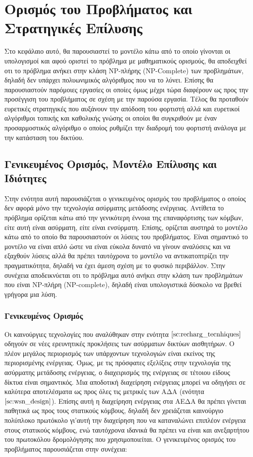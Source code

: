 

\chapter{Ορισμός του Προβλήματος και Στρατηγικές Επίλυσης} \label{ch:strategies_solution}
Στο κεφάλαιο αυτό, θα παρουσιαστεί το μοντέλο κάτω από το οποίο γίνονται οι υπολογισμοί και αφού οριστεί το πρόβλημα με μαθηματικούς ορισμούς, θα αποδειχθεί οτι το
πρόβλημα ανήκει στην κλάση NP-πλήρης (NP-Complete) των προβλημάτων, δηλαδή δεν υπάρχει πολυωνιμικός αλγόριθμος που να το λύνει. Επίσης θα παρουσιαστούν παρόμοιες
εργασίες οι οποίες όμως μέχρι τώρα διαφέρουν ως προς την προσέγγιση του προβλήματος σε σχέση με την παρούσα εργασία. Τέλος θα προταθούν ευρετικές στρατηγικές που
αυξάνουν την απόδοση του φορτιστή αλλά και ευρετικοί αλγόριθμοι τοπικής και καθολικής γνώσης οι οποίοι θα συγκριθούν με έναν προσαρμοστικός αλγόριθμο ο οποίος
ρυθμίζει την διαδρομή του φορτιστή ανάλογα με την κατάσταση του δικτύου.


\section{Γενικευμένος Ορισμός, Μοντέλο Επίλυσης και Ιδιότητες}
Στην ενότητα αυτή παρουσιάζεται ο γενικευμένος ορισμός του προβλήματος ο οποίος δεν αφορά μόνο την τεχνολογία ασύρματης μετάδοσης ενέργειας. Αντίθετα το πρόβλημα
ορίζεται κάτω από την γενικότερη έννοια της επαναφόρτισης των κόμβων, είτε αυτή είναι ασύρματη, είτε είναι ενσύρματη. Επίσης, ορίζεται αυστηρά το μοντέλο κάτω από το
οποίο θα παρουσιαστούν οι λύσεις του προβλήματος. Είναι σημαντικό το μοντέλο να είναι απλό ώστε να είναι εύκολα δυνατό να γίνουν αναλύσεις και να εξαχθούν λύσεις
αλλά θα πρέπει ταυτόχρονα το μοντέλο να αντικατοπτρίζει την πραγματικότητα, δηλαδή να έχει άμεση σχέση με το φυσικό περιβάλλον. Στην συνέχεια αποδεικνύεται οτι το
πρόβλημα αυτό ανήκει στην κλάση των προβλημάτων που είναι NP-πλήρη (NP-complete), δηλαδή είναι υπολογιστικά δύσκολο να βρεθεί γρήγορα μια λύση.

\subsection{Γενικευμένος Ορισμός}
Οι καινούργιες τεχνολογίες που αναλύθηκαν στην ενότητα $\ref{sc:recharg_tecnhiques}$ οδηγούν σε νέες ερευνητικές προκλήσεις των ασύρματων δικτύων αισθητήρων. Ο πλέον
μεγάλος περιορισμός των υπάρχοντων τεχνολογιών είναι εκείνος της περιορισμένης ενέργειας. Όμως, με τις πρόσφατες εξελίξεις στην τεχνολογία της ασύρματης μετάδοσης
ενέργειας, ο διαχειρισμός της ενέργειας σε τέτοιου είδους δίκτυα είναι σημαντικός. Μια αποδοτική διαχείρηση ενέργειας μπορεί να οδηγήσει σε καλύτερα αποτελέσματα ως
προς όλες τις μετρικές των ΑΔΑ (ενότητα $\ref{sc:wsn_design}$). Επίσης αυτή η διαχείρηση ενέργειας στα ΑΕΔΑ θα πρέπει γίνεται παθητικά ως προς τους στατικούς κόμβους,
δηλαδή δεν χρειάζεται καινούργιο πολύπλοκο πρωτόκολο γι'αυτή την διαχείρηση που να καταναλώνει επιπλέον ενέργεια στους στατικούς κόμβους, ενώ ταυτόχρονα ιδανικά θα
πρέπει να είναι και ανεξαρτήτου του πρωτοκόλου δρομολόγησης που χρησιμοποιείται. Ο γενικευμένος ορισμός του προβλήματος παρουσιάζεται στην συνέχεια:

